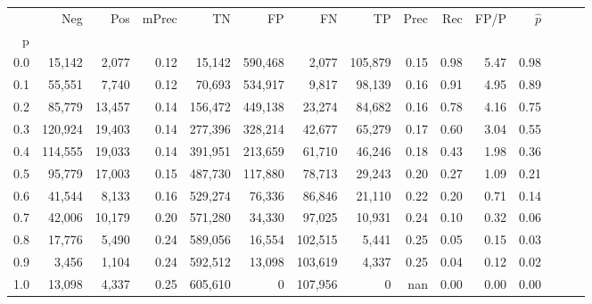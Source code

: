 \begin{tabular}{rrrrrrrrrrrrrrr}
\toprule
{} &      Neg &     Pos & mPrec &       TN &       FP &       FN &       TP &  Prec &   Rec &  FP/P & $\hat{p}$ \\
p   &          &         &       &          &          &          &          &       &       &       &           \\
\midrule
0.0 &   15,142 &   2,077 &  0.12 &   15,142 &  590,468 &    2,077 &  105,879 &  0.15 &  0.98 &  5.47 &      0.98 \\
0.1 &   55,551 &   7,740 &  0.12 &   70,693 &  534,917 &    9,817 &   98,139 &  0.16 &  0.91 &  4.95 &      0.89 \\
0.2 &   85,779 &  13,457 &  0.14 &  156,472 &  449,138 &   23,274 &   84,682 &  0.16 &  0.78 &  4.16 &      0.75 \\
0.3 &  120,924 &  19,403 &  0.14 &  277,396 &  328,214 &   42,677 &   65,279 &  0.17 &  0.60 &  3.04 &      0.55 \\
0.4 &  114,555 &  19,033 &  0.14 &  391,951 &  213,659 &   61,710 &   46,246 &  0.18 &  0.43 &  1.98 &      0.36 \\
0.5 &   95,779 &  17,003 &  0.15 &  487,730 &  117,880 &   78,713 &   29,243 &  0.20 &  0.27 &  1.09 &      0.21 \\
0.6 &   41,544 &   8,133 &  0.16 &  529,274 &   76,336 &   86,846 &   21,110 &  0.22 &  0.20 &  0.71 &      0.14 \\
0.7 &   42,006 &  10,179 &  0.20 &  571,280 &   34,330 &   97,025 &   10,931 &  0.24 &  0.10 &  0.32 &      0.06 \\
0.8 &   17,776 &   5,490 &  0.24 &  589,056 &   16,554 &  102,515 &    5,441 &  0.25 &  0.05 &  0.15 &      0.03 \\
0.9 &    3,456 &   1,104 &  0.24 &  592,512 &   13,098 &  103,619 &    4,337 &  0.25 &  0.04 &  0.12 &      0.02 \\
1.0 &   13,098 &   4,337 &  0.25 &  605,610 &        0 &  107,956 &        0 &   nan &  0.00 &  0.00 &      0.00 \\
\bottomrule
\end{tabular}
